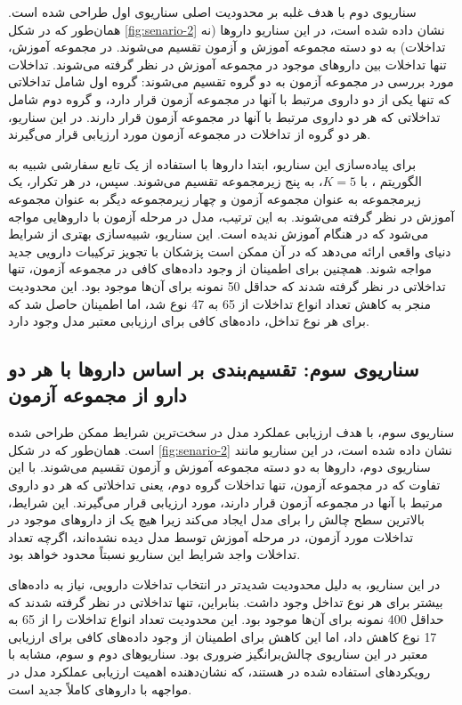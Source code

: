 سناریوی دوم با هدف غلبه بر محدودیت اصلی سناریوی اول طراحی شده است. همان‌طور که در شکل \ref{fig:senario-2} نشان داده شده است، در این سناریو داروها (نه تداخلات) به دو دسته مجموعه آموزش و آزمون تقسیم می‌شوند. در مجموعه آموزش، تنها تداخلات بین داروهای موجود در مجموعه آموزش در نظر گرفته می‌شوند. تداخلات مورد بررسی در مجموعه آزمون به دو گروه تقسیم می‌شوند: گروه اول شامل تداخلاتی که تنها یکی از دو داروی مرتبط با آنها در مجموعه آزمون قرار دارد، و گروه دوم شامل تداخلاتی که هر دو داروی مرتبط با آنها در مجموعه آزمون قرار دارند. در این سناریو، هر دو گروه از تداخلات در مجموعه آزمون مورد ارزیابی قرار می‌گیرند.

برای پیاده‌سازی این سناریو، ابتدا داروها با استفاده از یک تابع سفارشی شبیه به الگوریتم ، با $K=5$، به پنج زیرمجموعه تقسیم می‌شوند. سپس، در هر تکرار، یک زیرمجموعه به عنوان مجموعه آزمون و چهار زیرمجموعه دیگر به عنوان مجموعه آموزش در نظر گرفته می‌شوند. به این ترتیب، مدل در مرحله آزمون با داروهایی مواجه می‌شود که در هنگام آموزش ندیده است. این سناریو، شبیه‌سازی بهتری از شرایط دنیای واقعی ارائه می‌دهد که در آن ممکن است پزشکان با تجویز ترکیبات دارویی جدید مواجه شوند. همچنین برای اطمینان از وجود داده‌های کافی در مجموعه آزمون، تنها تداخلاتی در نظر گرفته شدند که حداقل 50 نمونه برای آن‌ها موجود بود. این محدودیت منجر به کاهش تعداد انواع تداخلات از 65 به 47 نوع شد، اما اطمینان حاصل شد که برای هر نوع تداخل، داده‌های کافی برای ارزیابی معتبر مدل وجود دارد.

\subsection{سناریوی سوم: تقسیم‌بندی بر اساس داروها با هر دو دارو از مجموعه آزمون}


سناریوی سوم، با هدف ارزیابی عملکرد مدل در سخت‌ترین شرایط ممکن طراحی شده است. همان‌طور که در شکل \ref{fig:senario-2} نشان داده شده است، در این سناریو مانند سناریوی دوم، داروها به دو دسته مجموعه آموزش و آزمون تقسیم می‌شوند. با این تفاوت که در مجموعه آزمون، تنها تداخلات گروه دوم، یعنی تداخلاتی که هر دو داروی مرتبط با آنها در مجموعه آزمون قرار دارند، مورد ارزیابی قرار می‌گیرند. این شرایط، بالاترین سطح چالش را برای مدل ایجاد می‌کند زیرا هیچ یک از داروهای موجود در تداخلات مورد آزمون، در مرحله آموزش توسط مدل دیده نشده‌اند، اگرچه تعداد تداخلات واجد شرایط این سناریو نسبتاً محدود خواهد بود.

در این سناریو، به دلیل محدودیت شدیدتر در انتخاب تداخلات دارویی، نیاز به داده‌های بیشتر برای هر نوع تداخل وجود داشت. بنابراین، تنها تداخلاتی در نظر گرفته شدند که حداقل 400 نمونه برای آن‌ها موجود بود. این محدودیت تعداد انواع تداخلات را از 65 به 17 نوع کاهش داد، اما این کاهش برای اطمینان از وجود داده‌های کافی برای ارزیابی معتبر در این سناریوی چالش‌برانگیز ضروری بود. سناریوهای دوم و سوم، مشابه با رویکردهای استفاده شده در \cite{ref_deng2020} هستند، که نشان‌دهنده اهمیت ارزیابی عملکرد مدل در مواجهه با داروهای کاملاً جدید است.


